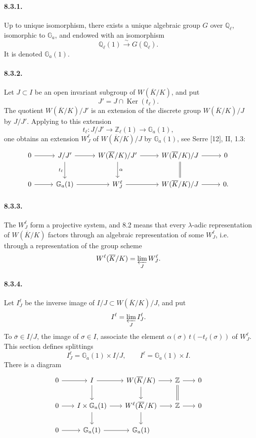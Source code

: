 \documentclass[10pt]{article}
\newcommand{\Z}{\mathbb Z}
\newcommand{\iso}{\xrightarrow{\sim}}
\providecommand{\Ker}{\operatorname{Ker}}
\providecommand{\Ker}{\operatorname{Ker}}
\begin{document}
\paragraph{8.3.1.} Up to unique isomorphism, there exists a unique algebraic group \(G\) over \(\mathbb Q_\ell\), isomorphic to \(\mathbb G_a\), and endowed with an isomorphism
\[
\mathbb Q_\ell(1)\iso G(\mathbb Q_\ell).
\]
It is denoted \(\mathbb G_a(1)\).

\paragraph{8.3.2.} Let \(J\subset I\) be an open invariant subgroup of \(W(\overline K/K)\), and put
\[
J'=J\cap\Ker(t_\ell).
\]
The quotient \(W(\overline K/K)/J'\) is an extension of the discrete group \(W(\overline K/K)/J\) by \(J/J'\). Applying to this extension
\[
t_\ell:J/J'\longrightarrow\mathbb Z_\ell(1)\longrightarrow\mathbb G_a(1),
\]
one obtains an extension \(W_J^\ell\) of \(W(\overline K/K)/J\) by \(\mathbb G_a(1)\), see Serre [12], II, 1.3:
\[
\begin{tikzcd}[column sep=2.7em,row sep=2.3em]
0 \arrow[r] & J/J' \arrow[r] \arrow[d,"t_\ell"'] &
W(\overline K/K)/J' \arrow[r] \arrow[d,"\alpha"] &
W(\overline K/K)/J \arrow[r] \arrow[d,equal] & 0\\
0 \arrow[r] & \mathbb G_a(1) \arrow[r] &
W_J^\ell \arrow[r] &
W(\overline K/K)/J \arrow[r] & 0 .
\end{tikzcd}
\]

\paragraph{8.3.3.} The \(W_J^\ell\) form a projective system, and 8.2 means that every \(\lambda\)-adic representation of \(W(\overline K/K)\) factors through an algebraic representation of some \(W_J^\ell\), i.e. through a representation of the group scheme
\[
W^\ell(\overline K/K)=\varprojlim_J W_J^\ell.
\]

\paragraph{8.3.4.} Let \(I_J^\ell\) be the inverse image of \(I/J\subset W(\overline K/K)/J\), and put
\[
I^\ell=\varprojlim_J I_J^\ell.
\]
To \(\bar\sigma\in I/J\), the image of \(\sigma\in I\), associate the element \(\alpha(\sigma)\,t(-t_\ell(\sigma))\) of \(W_J^\ell\). This section defines splittings
\[
I_J^\ell=\mathbb G_a(1)\times I/J,
\qquad
I^\ell=\mathbb G_a(1)\times I.
\]
There is a diagram
\[
\begin{tikzcd}[column sep=1.8em,row sep=1.8em]
0 \arrow[r] & I \arrow[r] \arrow[d] & W(\overline K/K) \arrow[r] \arrow[d] & \Z \arrow[r] \arrow[d,equal] & 0\\
0 \arrow[r] & I\times\mathbb G_a(1) \arrow[r] \arrow[d] & W^\ell(\overline K/K) \arrow[r] \arrow[d] & \Z \arrow[r] & 0\\
0 \arrow[r] & \mathbb G_a(1) \arrow[r] & \mathbb G_a(1) & &
\end{tikzcd}
\]
\end{document}
